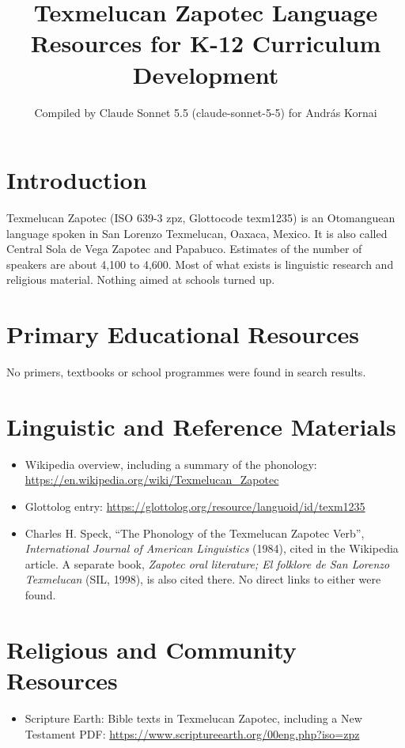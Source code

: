 \documentclass[12pt]{article}
\title{Texmelucan Zapotec Language Resources for K-12 Curriculum Development}
\author{Compiled by Claude Sonnet 5.5 (claude-sonnet-5-5) for Andr\'as Kornai}
\date{}
\begin{document}
\maketitle

\section{Introduction}
Texmelucan Zapotec (ISO 639-3 zpz, Glottocode texm1235) is an Otomanguean language spoken in San Lorenzo Texmelucan, Oaxaca, Mexico. It is also called Central Sola de Vega Zapotec and Papabuco. Estimates of the number of speakers are about 4,100 to 4,600. Most of what exists is linguistic research and religious material. Nothing aimed at schools turned up.

\section{Primary Educational Resources}
No primers, textbooks or school programmes were found in search results.

\section{Linguistic and Reference Materials}
\begin{itemize}
\item Wikipedia overview, including a summary of the phonology: \url{https://en.wikipedia.org/wiki/Texmelucan_Zapotec}
\item Glottolog entry: \url{https://glottolog.org/resource/languoid/id/texm1235}
\item Charles H. Speck, ``The Phonology of the Texmelucan Zapotec Verb'', \emph{International Journal of American Linguistics} (1984), cited in the Wikipedia article. A separate book, \emph{Zapotec oral literature; El folklore de San Lorenzo Texmelucan} (SIL, 1998), is also cited there. No direct links to either were found.
\end{itemize}

\section{Religious and Community Resources}
\begin{itemize}
\item Scripture Earth: Bible texts in Texmelucan Zapotec, including a New Testament PDF: \url{https://www.scriptureearth.org/00eng.php?iso=zpz}
\end{itemize}
\end{document}
